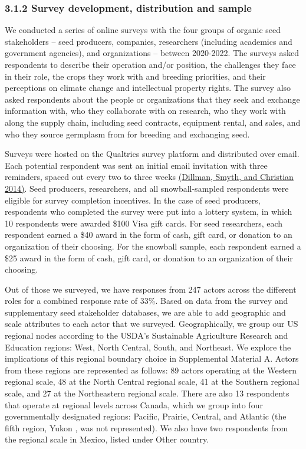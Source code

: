 \documentclass[twoside,12pt,final]{ucthesis-CA2012}
\begin{document}
\begin{ucmainmatter}
\hypertarget{survey-development-distribution-and-sample}{%
\subsubsection{3.1.2 Survey development, distribution and sample}\label{survey-development-distribution-and-sample}}

We conducted a series of online surveys with the four groups of organic
seed stakeholders -- seed producers, companies, researchers (including
academics and government agencies), and organizations -- between
2020-2022. The surveys asked respondents to describe their operation
and/or position, the challenges they face in their role, the crops they
work with and breeding priorities, and their perceptions on climate
change and intellectual property rights. The survey also asked
respondents about the people or organizations that they seek and
exchange information with, who they collaborate with on research, who
they work with along the supply chain, including seed contracts,
equipment rental, and sales, and who they source germplasm from for
breeding and exchanging seed.

Surveys were hosted on the Qualtrics survey platform and distributed
over email. Each potential respondent was sent an initial email
invitation with three reminders, spaced out every two to three weeks
\href{https://www.zotero.org/google-docs/?vs7ZWm}{(Dillman, Smyth, and Christian
2014)}. Seed producers,
researchers, and all snowball-sampled respondents were eligible for
survey completion incentives. In the case of seed producers, respondents
who completed the survey were put into a lottery system, in which 10
respondents were awarded \$100 Visa gift cards. For seed researchers,
each respondent earned a \$40 award in the form of cash, gift card, or
donation to an organization of their choosing. For the snowball sample,
each respondent earned a \$25 award in the form of cash, gift card, or
donation to an organization of their choosing.

Out of those we surveyed, we have responses from 247 actors across the
different roles for a combined response rate of 33\%. Based on data from
the survey and supplementary seed stakeholder databases, we are able to
add geographic and scale attributes to each actor that we surveyed.
Geographically, we group our US regional nodes according to the USDA's
Sustainable Agriculture Research and Education regions: West, North
Central, South, and Northeast. We explore the implications of this
regional boundary choice in Supplemental Material A. Actors from these
regions are represented as follows: 89 actors operating at the Western
regional scale, 48 at the North Central regional scale, 41 at the
Southern regional scale, and 27 at the Northeastern regional scale.
There are also 13 respondents that operate at regional levels across
Canada, which we group into four governmentally designated regions:
Pacific, Prairie, Central, and Atlantic (the fifth region, Yukon , was
not represented). We also have two respondents from the regional scale
in Mexico, listed under \textquotesingle Other country\textquotesingle.


\end{ucmainmatter}
\end{document}
